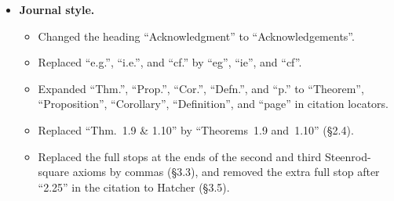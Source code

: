 \begin{itemize}
\item \textbf{Journal style.}
\begin{itemize}
\item Changed the heading ``Acknowledgment'' to ``Acknowledgements''.
\item Replaced ``e.g.'', ``i.e.'', and ``cf.'' by ``eg'', ``ie'', and ``cf''.
\item Expanded ``Thm.'', ``Prop.'', ``Cor.'', ``Defn.'', and ``p.'' to ``Theorem'', ``Proposition'', ``Corollary'', ``Definition'', and ``page'' in citation locators.
\item Replaced ``Thm.~1.9 \& 1.10'' by ``Theorems~1.9 and~1.10'' (\S2.4).
\item Replaced the full stops at the ends of the second and third Steenrod-square axioms by commas (\S3.3), and removed the extra full stop after ``2.25'' in the citation to Hatcher (\S3.5).
\end{itemize}
\end{itemize}
